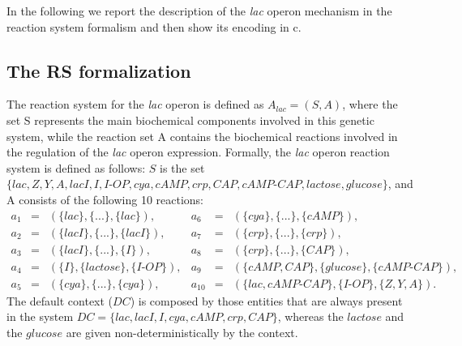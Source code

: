 In the following we report the description of the \emph{lac} operon mechanism in the reaction system formalism
and then show its encoding in c\CNA. 

\subsection{The RS formalization}\label{subsec:RSlacoperon}
The reaction system for the \emph{lac} operon is defined as
$A_{lac} = (S, A)$, where the set S represents
the main biochemical components involved in this genetic system, while the reaction set A contains the biochemical
reactions involved in the regulation of the \emph{lac} operon expression. Formally, the \emph{lac} operon reaction system is defined as
follows:
$S$ is the set\\ $\{lac, Z, Y, A, lacI, I, I\textrm{-}OP, cya, cAMP, crp, CAP,cAMP\textrm{-}CAP, lactose,glucose\}$,
and A consists of the following 10 reactions:
{\small
\[
\begin{array}{lcllcl}
a_1 &= &(\{lac\},\{. . .\},\{lac\}), & a_6 &= &(\{cya\},\{. . .\},\{cAMP\}),\\
a_2 &= &(\{lacI\},\{. . .\},\{lacI\}), & a_7 &= &(\{crp\},\{. . .\},\{crp\}),\\
a_3 &= &(\{lacI\},\{. . .\},\{I\}), & a_8 &= &(\{crp\},\{. . .\},\{CAP\}),\\
a_4 &= &(\{I\},\{lactose\},\{I\textrm{-}OP\}), & a_9 &= &(\{cAMP, CAP\},\{glucose\},\{cAMP\textrm{-}CAP\}),\\
a_5 &= &(\{cya\},\{. . .\},\{cya\}),&
a_{10} &=& (\{lac, cAMP\textrm{-}CAP\},\{I\textrm{-}OP\},\{Z, Y, A\}).
\end{array}
\]
}
The default context ($DC$) is composed by those entities that are always present in the system
$DC = \{lac,lacI,I,cya,cAMP,crp,CAP\}$, whereas the $lactose$ and the $glucose$ are given non-deterministically by the context.
